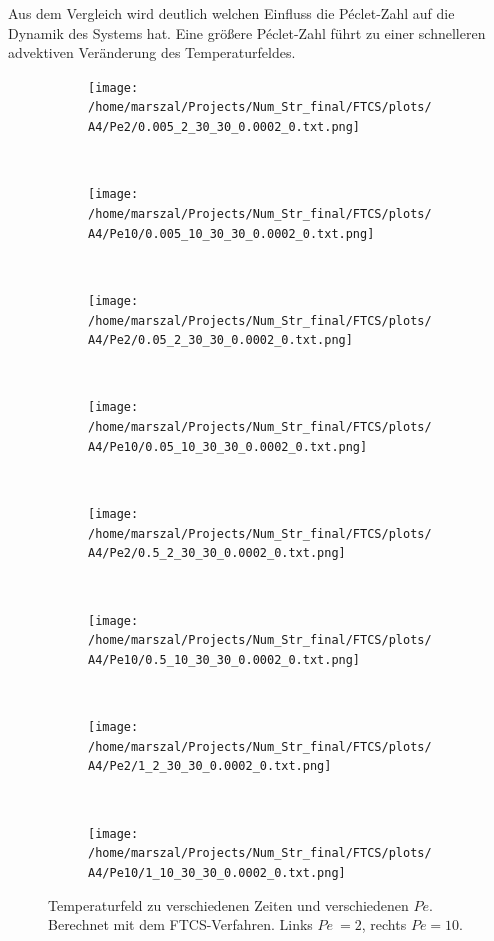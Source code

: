 Aus dem Vergleich wird deutlich welchen Einfluss die Péclet-Zahl auf die Dynamik des Systems hat. Eine größere Péclet-Zahl führt zu einer schnelleren advektiven Veränderung des Temperaturfeldes.

\begin{figure}
  \centering
    \begin{subfigure}[b]{0.48\textwidth}
      \texttt{[image: /home/marszal/Projects/Num\_Str\_final/FTCS/plots/A4/Pe2/0.005\_2\_30\_30\_0.0002\_0.txt.png]}
    \end{subfigure}
    ~
    \begin{subfigure}[b]{0.48\textwidth}
      \texttt{[image: /home/marszal/Projects/Num\_Str\_final/FTCS/plots/A4/Pe10/0.005\_10\_30\_30\_0.0002\_0.txt.png]}
    \end{subfigure}
    \\
    \begin{subfigure}[b]{0.48\textwidth}
      \texttt{[image: /home/marszal/Projects/Num\_Str\_final/FTCS/plots/A4/Pe2/0.05\_2\_30\_30\_0.0002\_0.txt.png]}
    \end{subfigure}
    ~
    \begin{subfigure}[b]{0.48\textwidth}
      \texttt{[image: /home/marszal/Projects/Num\_Str\_final/FTCS/plots/A4/Pe10/0.05\_10\_30\_30\_0.0002\_0.txt.png]}
    \end{subfigure}
    \\
    \begin{subfigure}[b]{0.48\textwidth}
      \texttt{[image: /home/marszal/Projects/Num\_Str\_final/FTCS/plots/A4/Pe2/0.5\_2\_30\_30\_0.0002\_0.txt.png]}
    \end{subfigure}
    ~
    \begin{subfigure}[b]{0.48\textwidth}
      \texttt{[image: /home/marszal/Projects/Num\_Str\_final/FTCS/plots/A4/Pe10/0.5\_10\_30\_30\_0.0002\_0.txt.png]}
    \end{subfigure}
    \\
    \begin{subfigure}[b]{0.48\textwidth}
      \texttt{[image: /home/marszal/Projects/Num\_Str\_final/FTCS/plots/A4/Pe2/1\_2\_30\_30\_0.0002\_0.txt.png]}
    \end{subfigure}
    ~
    \begin{subfigure}[b]{0.48\textwidth}
      \texttt{[image: /home/marszal/Projects/Num\_Str\_final/FTCS/plots/A4/Pe10/1\_10\_30\_30\_0.0002\_0.txt.png]}
    \end{subfigure}
  \caption{Temperaturfeld zu verschiedenen Zeiten und verschiedenen $Pe$. Berechnet mit dem FTCS-Verfahren. Links $Pe~=2$, rechts $Pe=10$.}\label{fig:A4}
\end{figure}
